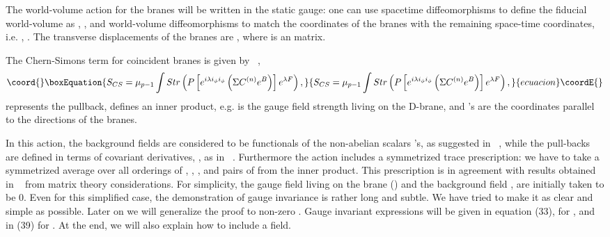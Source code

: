 \documentclass[a4paper,12pt]{article}
\begin{document}
   The world-volume action for the \coordHE{} branes will be written in the static gauge: one can use spacetime diffeomorphisms to define the fiducial world-volume as \coordHE{}, \coordHE{}, and world-volume diffeomorphisms to match the coordinates of the branes with the remaining space-time coordinates, i.e. \coordHE{}, \coordHE{}. The transverse displacements of the branes are  \coordHE{}, where \coordHE{} is an \coordHE{} matrix. 


   The Chern-Simons term for \coordHE{} coincident \coordHE{} branes is given by ~\cite{myers},
\begin{equation}\coord{}\boxEquation{
S_{CS}=\mu_{p-1}\int Str\left(P \left[ e^{i\lambda i_\phi i_\phi} \left(\Sigma C^{\left(n\right)}e^B\right)\right]e^{\lambda F}\right),
}{
S_{CS}=\mu_{p-1}\int Str\left(P \left[ e^{i\lambda i_\phi i_\phi} \left(\Sigma C^{\left(n\right)}e^B\right)\right]e^{\lambda F}\right),
}{ecuacion}\coordE{}\end{equation}
   \coordHE{} represents the pullback, 
   \coordHE{} defines an inner product, e.g. \coordHE{}
   \coordHE{} is the gauge field strength living on the D-brane, and
   \myHighlight{$\sigma$}\coordHE{}'s are the coordinates parallel to the directions of the branes.
  

    In this action, the background fields are considered to be functionals of the non-abelian scalars \myHighlight{$\phi$}\coordHE{}'s, as suggested in ~\cite{douglas}, while the pull-backs are defined in terms of covariant derivatives, \coordHE{}, as in ~\cite{hull}. Furthermore the action includes a symmetrized trace prescription: we have to take  a symmetrized average over all orderings of \coordHE{}, \coordHE{}, \coordHE{}, and pairs of \coordHE{} from the inner product. This prescription is in agreement with results obtained in ~\cite{taylor2} from matrix theory considerations.  
    For simplicity, the gauge field living on the brane (\coordHE{}) and the background \coordHE{} field \coordHE{}, are initially taken to be 0. Even for this simplified case, the demonstration of gauge invariance is rather long and subtle. We have tried to make it as clear and simple as possible. Later on we will generalize the proof to non-zero \coordHE{}. Gauge invariant expressions will be given in equation (33), for \coordHE{}, and in (39) for \coordHE{}. At the end, we will also explain how to include a \coordHE{} field.  
   
\end{document}
